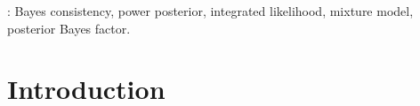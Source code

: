 \documentclass[11pt]{article}
\theoremstyle{plain}
\theoremstyle{definition}
\theoremstyle{remark}
\begin{document}
:
Bayes consistency,
power posterior,
integrated likelihood,
mixture model,
posterior Bayes factor.











\section{Introduction}









\end{document}
